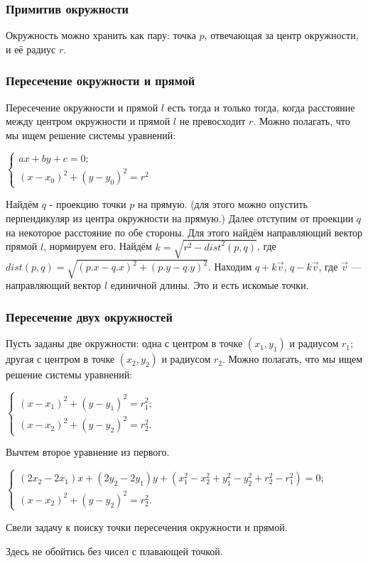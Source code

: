 
\subsubsection*{Примитив окружности}

Окружность можно хранить как пару: точка $p$, отвечающая за центр окружности, и её радиус $r$.

\subsubsection*{Пересечение окружности и прямой}

Пересечение окружности и прямой $l$ есть тогда и только тогда, когда расстояние между центром окружности и прямой $l$ не превосходит $r$. Можно полагать, что мы ищем решение системы уравнений:

\begin{center}
    $\begin{cases}
    ax + by + c = 0; \\
    (x - x_0)^2 + (y - y_0)^2 = r^2
    \end{cases}$
\end{center}

Найдём $q$ - проекцию точки $p$ на прямую. (для этого можно опустить перпендикуляр из центра окружности на прямую.) Далее отступим от проекции $q$ на некоторое расстояние по обе стороны. Для этого найдём направляющий вектор прямой $l$, нормируем его. Найдём $k = \sqrt{r^2 - {dist}^2 (p, q)}$, где $dist (p, q) = \sqrt{(p.x - q.x)^2 + (p.y - q.y)^2}$. Находим $q + k \vec{v}$, $q - k \vec{v}$, где $\vec{v}$ — направляющий вектор $l$ единичной длины. Это и есть искомые точки.

\subsubsection*{Пересечение двух окружностей}

Пусть заданы две окружности: одна с центром в точке $(x_1, y_1)$ и радиусом $r_1$; другая с центром в точке $(x_2, y_2)$ и радиусом $r_2$. Можно полагать, что мы ищем решение системы уравнений:

\begin{center}
    $\begin{cases}
        (x - x_1)^2 + (y - y_1)^2 = r_1^2; \\
        (x - x_2)^2 + (y - y_2)^2  = r_2^2.
    \end{cases}$
\end{center}

Вычтем второе уравнение из первого.

\begin{center}
    $\begin{cases}
        (2x_2-2x_1)x + (2y_2-2y_1)y + (x^2_1 - x^2_2 + y^2_1 - y^2_2 + r^2_2 - r_1^2) = 0; \\
        (x - x_2)^2 + (y - y_2)^2  = r_2^2.
    \end{cases}$
\end{center}

Свели задачу к поиску точки пересечения окружности и прямой.

Здесь не обойтись без чисел с плавающей точкой.
